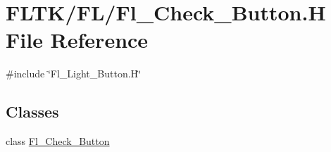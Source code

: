 \hypertarget{_fl___check___button_8_h}{}\section{F\+L\+T\+K/\+F\+L/\+Fl\+\_\+\+Check\+\_\+\+Button.H File Reference}
\label{_fl___check___button_8_h}
{\ttfamily \#include \char`\"{}Fl\+\_\+\+Light\+\_\+\+Button.\+H\char`\"{}}\newline
\subsection*{Classes}
\begin{DoxyCompactItemize}
\item 
class \hyperlink{class_fl___check___button}{Fl\+\_\+\+Check\+\_\+\+Button}
\end{DoxyCompactItemize}

